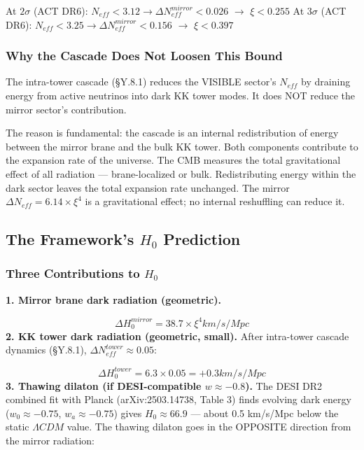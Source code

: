 \documentclass[aps,prd,preprint,superscriptaddress,longbibliography,floatfix]{revtex4-2}
\theoremstyle{remark}
\begin{document}
At $2\sigma$ (ACT DR6): $N_{eff} < 3.12 \to \Delta N_{eff}^{mirror} < 0.026$ $\to$ \textbf{$\xi < 0.255$} At $3\sigma$ (ACT DR6): $N_{eff} < 3.25 \to \Delta N_{eff}^{mirror} < 0.156$ $\to$ \textbf{$\xi < 0.397$}


\subsubsection{Why the Cascade Does Not Loosen This Bound}

The \cite{GonzaloNeutrinoTowers2024} intra-tower cascade (\S{}Y.8.1) reduces the VISIBLE sector's $N_{eff}$ by draining energy from active neutrinos into dark KK tower modes. It does NOT reduce the mirror sector's contribution.

The reason is fundamental: the cascade is an internal redistribution of energy between the mirror brane and the bulk KK tower. Both components contribute to the expansion rate of the universe. The CMB measures the total gravitational effect of all radiation --- brane-localized or bulk. Redistributing energy within the dark sector leaves the total expansion rate unchanged. The mirror $\Delta N_{eff} = 6.14 \times \xi^{4}$ is a gravitational effect; no internal reshuffling can reduce it.



\subsection{The Framework's $H_{0}$ Prediction}


\subsubsection{Three Contributions to $H_{0}$}

\textbf{1. Mirror brane dark radiation (geometric).}


\begin{equation}
    \Delta H_{0}^{mirror} = 38.7 \times \xi^{4}  km/s/Mpc
\end{equation}
\textbf{2. KK tower dark radiation (geometric, small).} After intra-tower cascade dynamics (\S{}Y.8.1), $\Delta N_{eff}^{tower} \approx 0.05$:


\begin{equation}
    \Delta H_{0}^{tower} = 6.3 \times 0.05 = +0.3 km/s/Mpc
\end{equation}
\textbf{3. Thawing dilaton (if DESI-compatible $w \approx -0.8$).} The DESI DR2 combined fit with Planck (arXiv:2503.14738, Table 3) finds evolving dark energy ($w_{0} \approx -0.75$, $w_{a} \approx -0.75$) gives $H_{0} \approx 66.9$ --- about 0.5 km/s/Mpc below the static $\Lambda CDM$ value. The thawing dilaton goes in the OPPOSITE direction from the mirror radiation:
\end{document}
